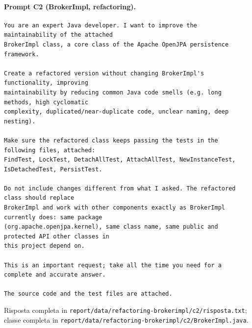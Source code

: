 \paragraph*{Prompt C2 (BrokerImpl, refactoring).}
\label{prompt:refactor-c2}
\begin{lstlisting}
You are an expert Java developer. I want to improve the maintainability of the attached
BrokerImpl class, a core class of the Apache OpenJPA persistence framework.

Create a refactored version without changing BrokerImpl's functionality, improving
maintainability by reducing common Java code smells (e.g. long methods, high cyclomatic
complexity, duplicated/near-duplicate code, unclear naming, deep nesting).

Make sure the refactored class keeps passing the tests in the following files, attached:
FindTest, LockTest, DetachAllTest, AttachAllTest, NewInstanceTest, IsDetachedTest, PersistTest.

Do not include changes different from what I asked. The refactored class should replace
BrokerImpl and work with other components exactly as BrokerImpl currently does: same package
(org.apache.openjpa.kernel), same class name, same public and protected API other classes in
this project depend on.

This is an important request; take all the time you need for a complete and accurate answer.

The source code and the test files are attached.
\end{lstlisting}
Risposta completa in \texttt{report/data/refactoring-brokerimpl/c2/risposta.txt}; classe
completa in \texttt{report/data/refactoring-brokerimpl/c2/BrokerImpl.java}.

